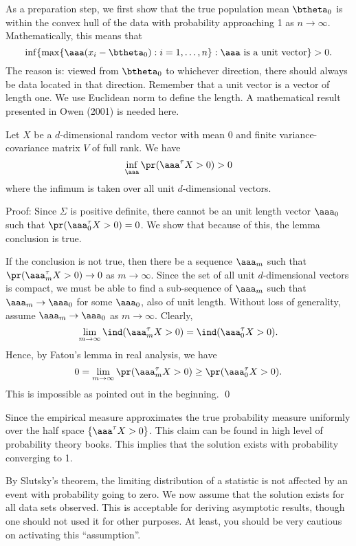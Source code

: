 As a preparation step, we first show that the true population mean
$\btheta_0$ is within the convex hull of the data with probability approaching 1 
as $n \to \infty$. 
Mathematically, this means that 
\[ 
\inf \{ \max\{ \aaa (x_i - \btheta_0): i=1, \ldots, n\}: \mbox{$\aaa$ is a unit vector} \} > 0.
\]
The reason is: viewed from $\btheta_0$ to whichever direction, 
there should always be data located in that direction. 
Remember that a unit vector is a vector of length one.
We use Euclidean norm to define the length.
A mathematical result presented in Owen (2001) is needed here. 

\begin{lemma}
Let $X$ be a $d$-dimensional random vector with mean 0 
and finite variance-covariance matrix $V$ of full rank. We have
\[
\inf_{\aaa} \pr( \aaa^\tau X > 0) > 0
\]
where the infimum is taken over all unit $d$-dimensional vectors.
\end{lemma}

\noindent
{\sc Proof}: Since $\Sigma$ is positive definite, there cannot be an 
unit length vector $\aaa_0$ such that $\pr ( \aaa_0 ^\tau X > 0 ) =0$.
We show that because of this, the lemma conclusion is true. 

If the conclusion is not true, then there be a sequence $\aaa_m$ such that 
$\pr( \aaa_m^\tau X > 0) \to 0$ as $m \to \infty$.
Since the set of all unit $d$-dimensional vectors is compact, 
we must be able to find a sub-sequence of $\aaa_m$ such that $\aaa_m \to \aaa_0$
for some $\aaa_0$, also of unit length. Without loss of generality, 
assume $\aaa_m \to \aaa_0$ as $m \to \infty$. 
Clearly,
\[
\lim_{m \to \infty} \ind ( \aaa_m ^\tau X > 0) = \ind ( \aaa_0 ^\tau X > 0).
\]
Hence, by Fatou's lemma in real analysis, we have
\[
0 = \lim_{m \to \infty} \pr(\aaa_m ^\tau X > 0) \geq \pr ( \aaa_0 ^\tau X > 0 ).
\]
This is impossible as pointed out in the beginning.
\qed


\vs
Since the empirical measure approximates the true probability measure 
uniformly over the half space $\{ \aaa^\tau X > 0\}$. 
This claim can be found in high level of probability theory books.
This implies that the solution exists with probability converging to 1.

By Slutsky's theorem, the limiting distribution 
of a statistic is not affected by an event with probability going to zero. 
We now assume that the solution exists for all data sets observed.
This is acceptable for deriving asymptotic results, though one should not
used it for other purposes. At least, you should be very cautious on
activating this ``assumption''.

